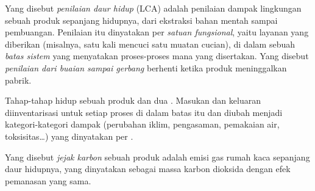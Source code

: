 \begin{definition}\label{def:b3:green-industrial:lca}
Yang disebut \emph{penilaian daur hidup} (LCA) adalah penilaian
dampak lingkungan sebuah produk sepanjang hidupnya, dari ekstraksi bahan mentah
sampai pembuangan. Penilaian itu dinyatakan per \emph{satuan fungsional},
yaitu layanan yang diberikan (misalnya, satu kali mencuci satu muatan cucian), di dalam sebuah
\emph{batas sistem} yang menyatakan proses-proses mana yang
disertakan. Yang disebut \emph{penilaian dari buaian sampai gerbang}
berhenti ketika produk meninggalkan pabrik.
\end{definition}

\begin{omfigure}

{\small Tahap-tahap hidup sebuah produk dan dua . Masukan dan keluaran
diinventarisasi untuk setiap proses di dalam batas itu dan diubah menjadi kategori-kategori
dampak (perubahan iklim, pengasaman, pemakaian air, toksisitas\dots) yang dinyatakan per
.}
\end{omfigure}

\begin{definition}\label{def:b3:green-industrial:carbon-footprint}
Yang disebut \emph{jejak karbon} sebuah produk adalah
emisi gas rumah kaca sepanjang daur hidupnya, yang dinyatakan sebagai massa karbon dioksida
dengan efek pemanasan yang sama.
\end{definition}

